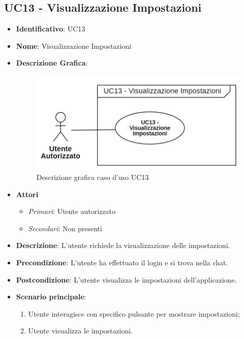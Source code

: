 \subsection{UC13 - Visualizzazione Impostazioni}
\begin{itemize}
	\item \textbf{Identificativo}: UC13
	\item \textbf{Nome}: Visualizzazione Impostazioni
	\item\textbf{Descrizione Grafica}: 
	\begin{figure}[h]
		\centering
		\includegraphics[scale=0.80]{images/UC13.png} 
		\caption{Descrizione grafica caso d'uso UC13}
	 \end{figure}

	\item \textbf{Attori}
	\begin{itemize} 
		\item \textit{Primari}: Utente autorizzato
		\item \textit{Secondari}: Non presenti
	\end{itemize}
	\item \textbf{Descrizione}: L'utente richiede la visualizzazione delle impostazioni.
	\item \textbf{Precondizione}: L'utente ha effettuato il login e si trova nella chat.
	\item \textbf{Postcondizione}: L'utente visualizza le impostazioni dell'applicazione.
	\item \textbf{Scenario principale}: \begin{enumerate}
		\item Utente interagisce con specifico pulsante per mostrare impostazioni;
		\item Utente visualizza le impostazioni.
	\end{enumerate}
\end{itemize}
\newpage